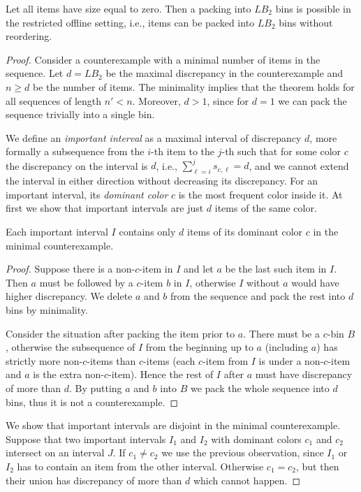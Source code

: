 \documentclass[11pt,a4paper]{article}
\def\vari#1{\mathit{#1}}
\begin{document}
\begin{theorem}
\label{thm:LB2feasible}
Let all items have size equal to zero.
Then a packing into $\vari{LB_2}$ bins is possible in the restricted offline setting,
i.e., items can be packed into $\vari{LB_2}$ bins without reordering.
\end{theorem}

\begin{proof}
Consider a counterexample with a minimal number of items in the sequence.
Let $d = \vari{LB_2}$ be the maximal discrepancy in the counterexample
and $n \geq d$ be the number of items.
The minimality implies that the theorem holds for all sequences of length $n' < n$.
Moreover, $d > 1$, since for $d = 1$ we can pack the sequence trivially
into a single bin.

We define an \textit{important interval} as a maximal interval of discrepancy $d$,
more formally a subsequence from the $i$-th item to the $j$-th such that
for some color $c$ the discrepancy on the interval is $d$, i.e., $\sum_{\ell=i}^{j} s_{c,\ell} = d$,
and we cannot extend the interval in either direction without decreasing its discrepancy.
For an important interval, its \textit{dominant color} $c$ is the most frequent color inside
it. At first we show that important intervals are just $d$ items of the same color.

\begin{observation}
Each important interval $I$ contains only $d$ items of its dominant color $c$ in the minimal counterexample.
\end{observation}
\begin{proof}
Suppose there is a non-$c$-item in $I$ and let $a$ be the last such item in $I$.
Then $a$ must be followed by a $c$-item $b$ in $I$, otherwise $I$ without $a$ would have higher discrepancy.
We delete $a$ and $b$ from the sequence and pack the rest into $d$ bins by minimality.

Consider the situation after packing the item prior to $a$.
There must be a $c$-bin $B$, otherwise the subsequence of $I$ from the beginning up to $a$ (including $a$)
has strictly more non-$c$-items than $c$-items
(each $c$-item from $I$ is under a non-$c$-item
and $a$ is the extra non-$c$-item).
Hence the rest of $I$ after $a$ must have discrepancy of more than $d$.
By putting $a$ and $b$ into $B$ we pack the whole sequence into $d$ bins,
thus it is not a counterexample.
\end{proof}

We show that important intervals are disjoint in the minimal counterexample.
Suppose that two important intervals $I_1$ and $I_2$ with dominant colors $c_1$ and $c_2$
intersect on an interval $J$. If $c_1 \neq c_2$ we use the previous observation,
since $I_1$ or $I_2$ has to contain an item from the other interval.
Otherwise $c_1 = c_2$, but then their union has discrepancy of more than $d$
which cannot happen.


\end{proof}
\end{document}
